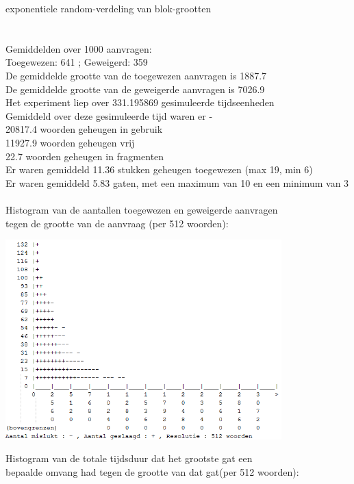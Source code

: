 \documentclass[a4paper]{article}
\begin{document}
			exponentiele random-verdeling van blok-grootten\\
			\\
			\\
			Gemiddelden over 1000 aanvragen:\\
			Toegewezen: 641 ; Geweigerd: 359\\
			De gemiddelde grootte van de toegewezen aanvragen is 1887.7\\
			De gemiddelde grootte van de geweigerde aanvragen is 7026.9\\
			Het experiment liep over 331.195869 gesimuleerde tijdseenheden\\
			Gemiddeld over deze gesimuleerde tijd waren er - \\
			 20817.4 woorden geheugen in gebruik\\
			 11927.9 woorden geheugen vrij\\
			    22.7 woorden geheugen in fragmenten\\
			Er waren gemiddeld    11.36 stukken geheugen toegewezen (max 19, min 6)\\
			Er waren gemiddeld     5.83 gaten, met een maximum van 10 en een minimum van 3\\
			\\
			Histogram van de aantallen toegewezen en geweigerde aanvragen\\
			tegen de grootte van de aanvraag (per 512 woorden):
			\begin{center}
				\includegraphics[width=0.8\textwidth]{wf3.png}
			\end{center}
			Histogram van de totale tijdsduur dat het grootste gat een\\
			bepaalde omvang had tegen de grootte van dat gat(per 512 woorden):
\end{document}
